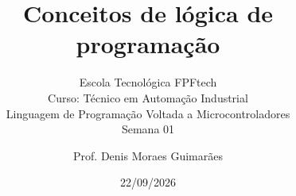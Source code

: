 \title{Conceitos de lógica de programação}
\subtitle{\texorpdfstring{Escola Tecnológica FPFtech\\[0.2cm]
Curso: Técnico em Automação Industrial\\[0.2cm]
\small Linguagem de Programação Voltada a Microcontroladores\\[0.15cm]
Semana 01}{FPFtech — Técnico em Automação Industrial — Semana 01}}
\author{Prof. Denis Moraes Guimarães}
\date{22/09/2026}
